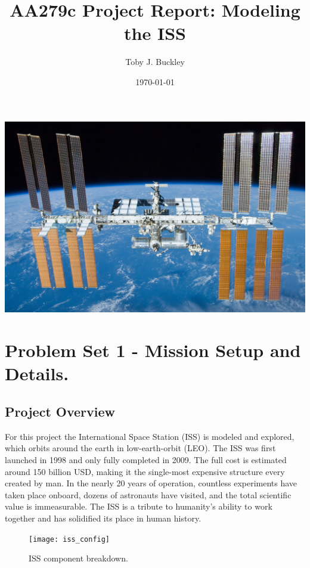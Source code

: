\documentclass[12pt, letterpaper]{article}
\title{AA279c Project Report: Modeling the ISS}
\author{Toby J. Buckley}
\date{\today}
\begin{document}
\begin{titlepage}
	\maketitle
	\centering
	\includegraphics[width=\textwidth]{ISS}
\end{titlepage}








\section{Problem Set 1 - Mission Setup and Details.}
\subsection{Project Overview}
For this project the International Space Station (ISS) is modeled and explored, which orbits around the earth in low-earth-orbit (LEO). The ISS was first launched in 1998 and only fully completed in 2009. The full cost is estimated around 150 billion USD, making it the single-most expensive structure every created by man. In the nearly 20 years of operation, countless experiments have taken place onboard, dozens of astronauts have visited, and the total scientific value is immeasurable. The ISS is a tribute to humanity's ability to work together and has solidified its place in human history.



\begin{figure}[H]
	\centering
	\texttt{[image: iss\_config]}
	\caption{ISS component breakdown.}
	\label{1:config}
\end{figure}
\end{document}
